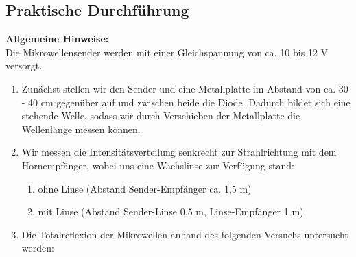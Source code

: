 \documentclass[12pt]{scrartcl}
\begin{document}
\subsection{Praktische Durchführung}
\textbf{Allgemeine Hinweise:}\\
Die Mikrowellensender werden mit einer Gleichspannung von ca. 10 bis 12 V versorgt.
\begin{enumerate}
\item Zunächst stellen wir den Sender und eine Metallplatte im Abstand von ca. 30 - 40 cm gegenüber auf und zwischen beide die Diode. Dadurch bildet sich eine stehende Welle, sodass wir durch Verschieben der Metallplatte die Wellenlänge messen können.
\item
Wir messen die Intensitätsverteilung senkrecht zur Strahlrichtung mit dem Hornempfänger, wobei uns eine Wachslinse zur Verfügung stand:
\begin{enumerate}
\item ohne Linse (Abstand Sender-Empfänger ca. 1,5 m)
\item mit Linse (Abstand Sender-Linse 0,5 m, Linse-Empfänger 1 m)
\end{enumerate}

\item Die Totalreflexion der Mikrowellen anhand des folgenden Versuchs untersucht werden:


\end{enumerate}
\end{document}
